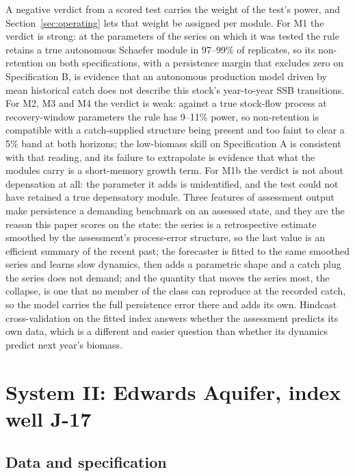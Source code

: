 \documentclass[preprint,11pt,authoryear]{elsarticle}
\theoremstyle{definition}
\theoremstyle{remark}
\begin{document}
A negative verdict from a scored test carries the weight of the test's power, and Section~\ref{sec:operating} lets that weight be assigned per module. For M1 the verdict is strong: at the parameters of the series on which it was tested the rule retains a true autonomous Schaefer module in 97--99\% of replicates, so its non-retention on both specifications, with a persistence margin that excludes zero on Specification B, is evidence that an autonomous production model driven by mean historical catch does not describe this stock's year-to-year SSB transitions. For M2, M3 and M4 the verdict is weak: against a true stock-flow process at recovery-window parameters the rule has 9--11\% power, so non-retention is compatible with a catch-supplied structure being present and too faint to clear a 5\% band at both horizons; the low-biomass skill on Specification A is consistent with that reading, and its failure to extrapolate is evidence that what the modules carry is a short-memory growth term. For M1b the verdict is not about depensation at all: the parameter it adds is unidentified, and the test could not have retained a true depensatory module. Three features of assessment output make persistence a demanding benchmark on an assessed state, and they are the reason this paper scores on the state: the series is a retrospective estimate smoothed by the assessment's process-error structure, so the last value is an efficient summary of the recent past; the forecaster is fitted to the same smoothed series and learns slow dynamics, then adds a parametric shape and a catch plug the series does not demand; and the quantity that moves the series most, the collapse, is one that no member of the class can reproduce at the recorded catch, so the model carries the full persistence error there and adds its own. Hindcast cross-validation on the fitted index \citep{Kell2016,Kell2021,Carvalho2021} answers whether the assessment predicts its own data, which is a different and easier question than whether its dynamics predict next year's biomass.
\FloatBarrier
\section{System II: Edwards Aquifer, index well J-17}\label{sec:edwards}

\subsection{Data and specification}\label{sec:edw_data}
\end{document}
